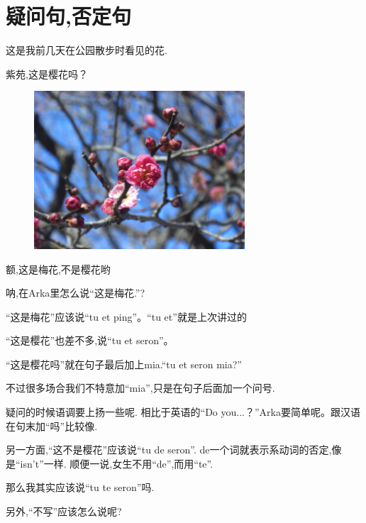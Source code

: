 \chapter[疑问句,否定句]{疑问句,否定句}

  



这是我前几天在公园散步时看见的花.

紫苑,这是樱花吗？
\begin{figure}[H]
\includegraphics[width=0.7\textwidth]{ARKA/ping.jpg}
\end{figure}

额,这是梅花,不是樱花哟

呐,在Arka里怎么说``这是梅花.''?

``这是梅花''应该说``tu et ping''。``tu et''就是上次讲过的

``这是樱花''也差不多,说``tu et seron''。

``这是樱花吗''就在句子最后加上mia.``tu et seron mia?''

不过很多场合我们不特意加``mia'',只是在句子后面加一个问号.


疑问的时候语调要上扬一些呢.
相比于英语的``Do you...？''Arka要简单呢。跟汉语在句末加``吗''比较像.


另一方面,``这不是樱花''应该说``tu de seron''.
de一个词就表示系动词的否定,像是``isn't''一样.
顺便一说,女生不用``de'',而用``te''.


那么我其实应该说``tu te seron''吗.

另外,``不写''应该怎么说呢?


